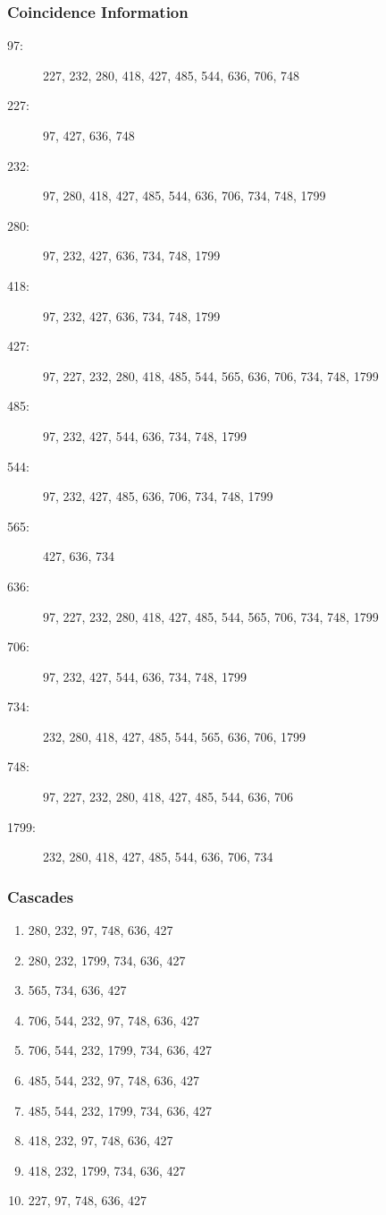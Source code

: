 \documentclass[12pt]{article}
\begin{document}
\subsubsection{Coincidence Information}
\begin{multicols}{2}
\begin{description}
\item[97: ] 227, 232, 280, 418, 427, 485, 544, 636, 706, 748
\item[227: ] 97, 427, 636, 748
\item[232: ] 97, 280, 418, 427, 485, 544, 636, 706, 734, 748, 1799
\item[280: ] 97, 232, 427, 636, 734, 748, 1799
\item[418: ] 97, 232, 427, 636, 734, 748, 1799
\item[427: ] 97, 227, 232, 280, 418, 485, 544, 565, 636, 706, 734, 748, 1799
\item[485: ] 97, 232, 427, 544, 636, 734, 748, 1799
\item[544: ] 97, 232, 427, 485, 636, 706, 734, 748, 1799
\item[565: ] 427, 636, 734
\item[636: ] 97, 227, 232, 280, 418, 427, 485, 544, 565, 706, 734, 748, 1799
\item[706: ] 97, 232, 427, 544, 636, 734, 748, 1799
\item[734: ] 232, 280, 418, 427, 485, 544, 565, 636, 706, 1799
\item[748: ] 97, 227, 232, 280, 418, 427, 485, 544, 636, 706
\item[1799: ] 232, 280, 418, 427, 485, 544, 636, 706, 734
\end{description}
\end{multicols}
\subsubsection{Cascades}
\begin{multicols}{2}
\begin{enumerate}
\item 280, 232, 97, 748, 636, 427
\item 280, 232, 1799, 734, 636, 427
\item 565, 734, 636, 427
\item 706, 544, 232, 97, 748, 636, 427
\item 706, 544, 232, 1799, 734, 636, 427
\item 485, 544, 232, 97, 748, 636, 427
\item 485, 544, 232, 1799, 734, 636, 427
\item 418, 232, 97, 748, 636, 427
\item 418, 232, 1799, 734, 636, 427
\item 227, 97, 748, 636, 427
\end{enumerate}
\end{multicols}



\end{document}
